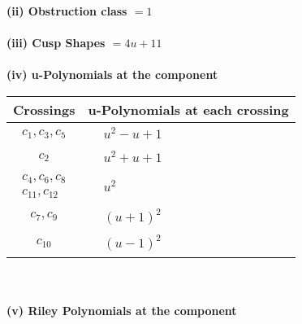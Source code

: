 \documentclass[1p]{elsarticle_modified}
\theoremstyle{definition}
\begin{document}
\flushleft \textbf{(ii) Obstruction class $= 1$}\\~\\
\flushleft \textbf{(iii) Cusp Shapes $= 4 u+11$}\\~\\
\newpage\renewcommand{\arraystretch}{1}
\flushleft \textbf{(iv) u-Polynomials at the component}\newline \\
\begin{tabular}{m{50pt}|m{274pt}}
Crossings & \hspace{64pt}u-Polynomials at each crossing \\
\hline $$\begin{aligned}c_{1},c_{3},c_{5}\end{aligned}$$&$\begin{aligned}
&u^2- u+1
\end{aligned}$\\
\hline $$\begin{aligned}c_{2}\end{aligned}$$&$\begin{aligned}
&u^2+u+1
\end{aligned}$\\
\hline $$\begin{aligned}c_{4},c_{6},c_{8}\\c_{11},c_{12}\end{aligned}$$&$\begin{aligned}
&u^2
\end{aligned}$\\
\hline $$\begin{aligned}c_{7},c_{9}\end{aligned}$$&$\begin{aligned}
&(u+1)^2
\end{aligned}$\\
\hline $$\begin{aligned}c_{10}\end{aligned}$$&$\begin{aligned}
&(u-1)^2
\end{aligned}$\\
\hline
\end{tabular}\\~\\
\newpage\renewcommand{\arraystretch}{1}
\flushleft \textbf{(v) Riley Polynomials at the component}\newline \\
\end{document}
